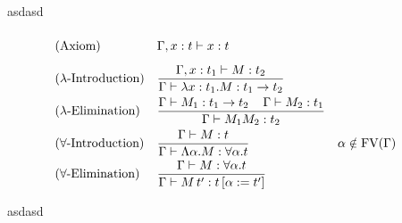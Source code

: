 \begin{frame}{asd}{asd}
\begin{mdframed} 
	\begingroup
	\addtolength{\jot}{0.3cm}
	\begin{align*}
		&(\text{Axiom}) &&\Gamma,x:t\lambdaModels x:t\vphantom{\frac{t_1}{t_1}}\\
		&(\lambda\text{-Introduction}) &&\frac{\Gamma,x:t_1\lambdaModels M:t_2}{\Gamma\lambdaModels \lambda x:t_1.M:t_1\to t_2}\\
		&(\lambda\text{-Elimination}) &&\frac{\Gamma\lambdaModels M_1:t_1\to t_2 \hspace{0.4cm}\Gamma\lambdaModels M_2:t_1}{\Gamma\lambdaModels M_1M_2:t_2}\\
& (\forall\text{-Introduction}) &   & \frac{\Gamma\lambdaModels M:t}{\Gamma\lambdaModels \Lambda\alpha.M:\forall\alpha.t}                 &   & \alpha\notin\FV(\Gamma) \\
& (\forall\text{-Elimination})  &   & \frac{\Gamma\lambdaModels M:\forall\alpha.t }{\Gamma\lambdaModels M\,t':t\left[ \alpha:=t'\right] } 
	\end{align*}
	\endgroup
\end{mdframed}
\end{frame}

\begin{frame}{asd}{asd}
\begin{figure}
	\centering
	
\end{figure}
\end{frame}